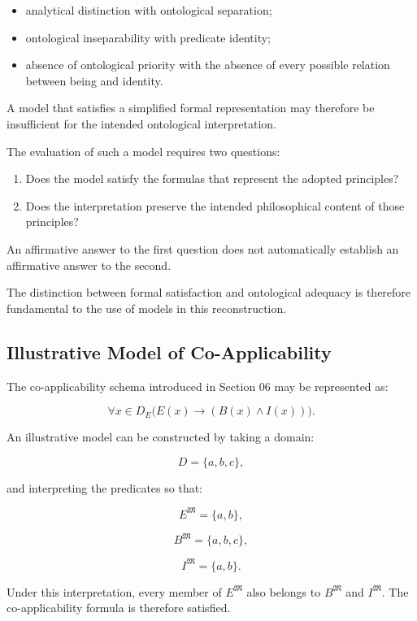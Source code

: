 \begin{itemize}
    \item analytical distinction with ontological separation;
    \item ontological inseparability with predicate identity;
    \item absence of ontological priority with the absence
    of every possible relation between being and identity.
\end{itemize}

A model that satisfies a simplified formal representation
may therefore be insufficient for the intended
ontological interpretation.

The evaluation of such a model requires two questions:

\begin{enumerate}
    \item Does the model satisfy the formulas that
    represent the adopted principles?

    \item Does the interpretation preserve the intended
    philosophical content of those principles?
\end{enumerate}

An affirmative answer to the first question does not
automatically establish an affirmative answer to the
second.

The distinction between formal satisfaction and
ontological adequacy is therefore fundamental to
the use of models in this reconstruction.

\subsection{Illustrative Model of Co-Applicability}

The co-applicability schema introduced in Section 06
may be represented as:

\[
    \forall x \in D_E
    \bigl(
        E(x) \rightarrow (B(x) \land I(x))
    \bigr).
\]

An illustrative model can be constructed by taking
a domain:

\[
    D = \{a,b,c\},
\]

and interpreting the predicates so that:

\[
    E^{\mathfrak{M}} = \{a,b\},
\]

\[
    B^{\mathfrak{M}} = \{a,b,c\},
\]

\[
    I^{\mathfrak{M}} = \{a,b\}.
\]

Under this interpretation, every member of
\(E^{\mathfrak{M}}\) also belongs to
\(B^{\mathfrak{M}}\) and \(I^{\mathfrak{M}}\).
The co-applicability formula is therefore satisfied.

